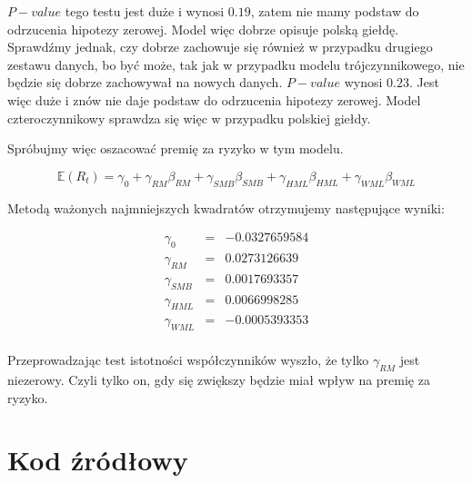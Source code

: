 \documentclass[11pt,a4paper]{report}
\begin{document}
$P-value$ tego testu jest duże i wynosi $0.19$, zatem nie mamy podstaw do odrzucenia hipotezy zerowej. Model więc dobrze opisuje polską giełdę. Sprawdźmy jednak, czy dobrze zachowuje się również w przypadku drugiego zestawu danych, bo być może, tak jak w przypadku modelu trójczynnikowego, nie będzie się dobrze zachowywał na nowych danych. $P-value$ wynosi $0.23$. Jest więc duże i znów nie daje podstaw do odrzucenia hipotezy zerowej. Model czteroczynnikowy sprawdza się więc w przypadku polskiej giełdy. 

\bigskip

Spróbujmy więc oszacować premię za ryzyko w tym modelu.

$$
\mathbb{E}(R_{t})=\gamma_0 + \gamma_{RM}\beta_{RM}+ \gamma_{SMB}\beta_{SMB}+ \gamma_{HML}\beta_{HML}+\gamma_{WML}\beta_{WML}
$$
 
Metodą ważonych najmniejszych kwadratów otrzymujemy następujące wyniki:

\begin{eqnarray*}
\gamma_0 &=& -0.0327659584 \\
\gamma_{RM}&=& 0.0273126639\\
\gamma_{SMB}&=& 0.0017693357\\
\gamma_{HML}&=& 0.0066998285\\
\gamma_{WML}&=& -0.0005393353\\
\end{eqnarray*}

Przeprowadzając test istotności współczynników wyszło, że tylko $\gamma_{RM}$ jest niezerowy. Czyli tylko on, gdy się zwiększy będzie miał wpływ na premię za ryzyko.
 
\section*{Kod źródłowy} 
 
\lstset{language=R} 
\end{document}
